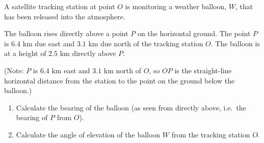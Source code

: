 \begin{question}
\noindent A satellite tracking station at point $O$ is monitoring a weather balloon, $W$, that has been released into the atmosphere.

\noindent The balloon rises directly above a point $P$ on the horizontal ground. The point $P$ is $6.4$ km due east and $3.1$ km due north of the tracking station $O$. The balloon is at a height of $2.5$ km directly above $P$.

\begin{center}
\end{center}

\noindent (Note: $P$ is $6.4$ km east and $3.1$ km north of $O$, so $OP$ is the straight-line horizontal distance from the station to the point on the ground below the balloon.)

\begin{enumerate}
    \item[(a)] Calculate the bearing of the balloon (as seen from directly above, i.e.\ the bearing of $P$ from $O$).
    \vspace{4cm}

    \item[(b)] Calculate the angle of elevation of the balloon $W$ from the tracking station $O$.
    \vspace{4cm}
\end{enumerate}
\end{question}
